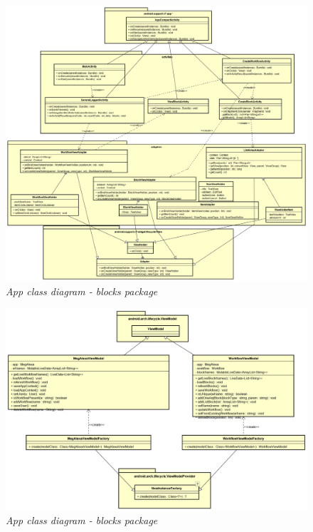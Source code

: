 \begin{figure} [H]
	\centering
	\includegraphics[scale=0.3]{./images/UI.png}
	\caption{\textit{App class diagram - blocks package}}\label{UI}
\end{figure}

\begin{figure} [H]
	\centering
	\includegraphics[scale=0.3]{./images/ViewModel.png}
	\caption{\textit{App class diagram - blocks package}}\label{ViewModel}
\end{figure}


